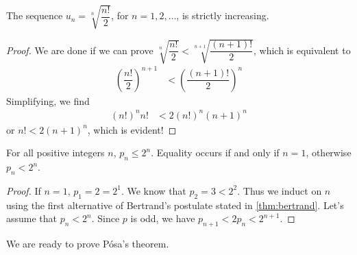 \documentclass{subfiles}
\begin{document}
	\begin{lemma}
		The sequence $u_n=\sqrt[n]{\dfrac{n!}{2}}$, for $n=1,2,\ldots$, is strictly increasing.\label{lem:n!/2}
	\end{lemma}

	\begin{proof}
		We are done if we can prove $\sqrt[n]{\dfrac{n!}{2}}<\sqrt[n+1]{\dfrac{(n+1)!}{2}}$, which is equivalent to
			\begin{align*}
				\left(\dfrac{n!}{2}\right)^{n+1}
					& < \left(\dfrac{(n+1)!}{2}\right)^n
			\end{align*}
		Simplifying, we find
			\begin{align*}
				 (n!)^n n!
				 	& <  2(n!)^n(n+1)^n
			\end{align*}
		or $n!  <  2(n+1)^n$, which is evident!
	\end{proof}

	\begin{lemma}
		For all positive integers $n$, $p_{n}\leq 2^{n}$. Equality occurs if and only if $n=1$, otherwise $p_n<2^n$.\label{lem:p_n<2^n}
	\end{lemma}

	\begin{proof}
		If $n=1$, $p_1=2=2^1$. We know that $p_2=3<2^2$. Thus we induct on $n$ using the first alternative of Bertrand's postulate stated in \autoref{thm:bertrand}. Let's assume that $p_n<2^n$. Since $p$ is odd, we have $p_{n+1}<2p_n<2^{n+1}$.
	\end{proof}

	We are ready to prove P\'{o}sa's theorem.
\end{document}
